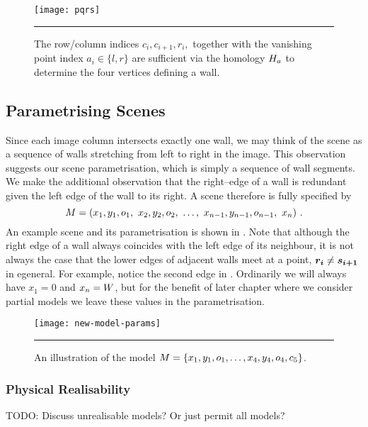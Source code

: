 \begin{figure}[tb]%
  \centering
  \label{fig:pqrs}
  \texttt{[image: pqrs]}
  \caption{The row/column indices $c_i,c_{i+1},r_i,$ together with
    the vanishing point index $a_i\in\{l,r\}$ are sufficient via the
    homology $\Hcf$ to determine the four vertices defining a
    wall.}
  \hrule
\end{figure}

\subsection{Parametrising Scenes}

Since each image column intersects exactly one wall, we may think of
the scene as a sequence of walls stretching from left to right in the
image. This observation suggests our scene parametrisation, which is
simply a sequence of wall segments. We make the additional observation
that the right--edge of a wall is redundant given the left edge of the
wall to its right. A scene therefore is fully specified by
\begin{equation}
  \label{eq:vertex-repr}
  \Scene =
  ( x_1,y_1,\WallOrient_1,
   ~x_2,y_2,\WallOrient_2,
   ~\ldots,
   ~x_{n-1},y_{n-1},\WallOrient_{n-1},
   ~x_n ) ~.
\end{equation}
An example scene and its parametrisation is shown in
. Note that although the right edge of a wall
always coincides with the left edge of its neighbour, it is not always
the case that the lower edges of adjacent walls meet at a point, \ie
$\vect{r_i} \neq \vect{s_{i+1}}$ in egeneral. For example, notice the
second edge in . Ordinarily we will always have
$x_1=0$ and $x_n=\Width$, but for the benefit of later chapter where
we consider partial models we leave these values in the
parametrisation.

\begin{figure}[tb]
  \centering
  \label{fig:scene-params}
  \texttt{[image: new-model-params]}
  \caption{An illustration of the model
    $\Scene=\{x_1,y_1,\WallOrient_1,\ldots,x_4,y_4,\WallOrient_4,c_5\}$.}
  \hrule
\end{figure}

\subsubsection{Physical Realisability}

TODO: Discuss unrealisable models? Or just permit all models?

